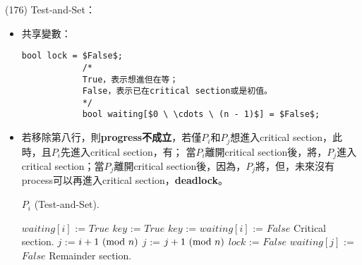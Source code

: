 \begin{theorem}{(176)} Test-and-Set：\begin{itemize}
        \item 共享變數：\begin{lstlisting}[caption={Shared variables of \textsc{Test-and-Set} solution.}, captionpos=b, mathescape=true]
            bool lock = $False$;
            /*
            True，表示想進但在等；
            False，表示已在critical section或是初值。
            */
            bool waiting[$0 \ \cdots \ (n - 1)$] = $False$;
        \end{lstlisting}
        \item 若移除第八行，則\textbf{progress不成立}，若僅$P_i$和$P_j$想進入critical section，此時，且$P_i$先進入critical section，有；
        當$P_i$離開critical section後，將，$P_j$進入critical section；當$P_j$離開critical section後，因為，$P_j$將，但，未來沒有process可以再進入critical section，\textbf{deadlock}。
        \begin{algorithm}[H]
            \caption{$P_i$ (Test-and-Set).}
            \label{algo:test-and-set-algo-2}
            \begin{algorithmic}[1]
                    \Repeat
                        \State $waiting[i]$ := $True$
                        \State $key$ := $True$ 
                            \State $key$ := 
                        \EndWhile
                        \State $waiting[i]$ := $False$
                        \State Critical section.
                        \State $j$ := $i + 1 \ (\mathrm{mod}\ n)$
                         
                            \State $j$ := $j + 1 \ (\mathrm{mod}\ n)$
                        \EndWhile
                         
                            \State $lock$ := $False$
                        \Else 
                            \State $waiting[j]$ := $False$
                        \EndIf
                        \State Remainder section.
                \EndFunction
            \end{algorithmic}
        \end{algorithm}
    \end{itemize}
\end{theorem}

